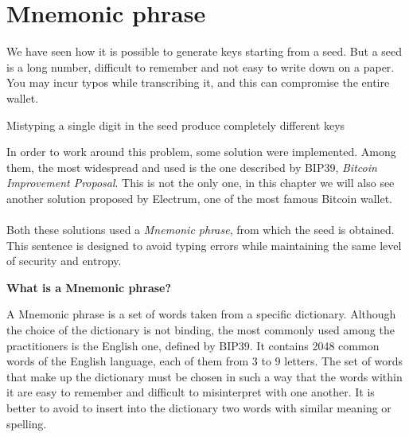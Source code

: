 
\chapter{Mnemonic phrase} %

\label{mnemonic} %




We have seen how it is possible to generate keys starting from a seed. But a seed is a long number, difficult to remember and not easy to write down on a paper. You may incur typos while transcribing it, and this can compromise the entire wallet.
\begin{remark}
	Mistyping a single digit in the seed produce completely different keys
\end{remark}
In order to work around this problem, some solution were implemented. Among them, the most widespread and used is the one described by BIP39, \textit{Bitcoin Improvement Proposal}. This is not the only one, in this chapter we will also see another solution proposed by Electrum, one of the most famous Bitcoin wallet.
\\ \\
Both these solutions used a \textit{Mnemonic phrase}, from which the seed is obtained. This sentence is designed to avoid typing errors while maintaining the same level of security and entropy.
\begin{flushleft}
	\textbf{What is a Mnemonic phrase?}
\end{flushleft}
A Mnemonic phrase is a set of words taken from a specific dictionary. Although the choice of the dictionary is not binding, the most commonly used among the practitioners is the English one, defined by BIP39. It contains 2048 common words of the English language, each of them from 3 to 9 letters. The set of words that make up the dictionary must be chosen in such a way that the words within it are easy to remember and difficult to misinterpret with one another. It is better to avoid to insert into the dictionary two words with similar meaning or spelling.

